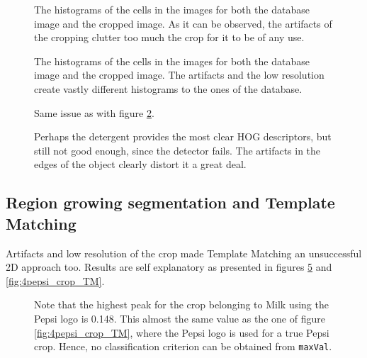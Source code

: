 \documentclass[../main.tex]{subfiles}
\begin{document}
\begin{figure}[htbp]
    \centering
    \caption{The histograms of the cells in the images for both the database image and the cropped image. As it can be observed, the artifacts of the cropping clutter too much the crop for it to be of any use.}
    \label{fig:hog_milk_crop}
\end{figure}

\begin{figure}[htbp]
    \centering
    \caption{The histograms of the cells in the images for both the database image and the cropped image. The artifacts and the low resolution create vastly different histograms to the ones of the database.}
    \label{fig:hog_pepsi_crop}
\end{figure}

\begin{figure}[htbp]
    \centering
    \caption{Same issue as with figure \ref{fig:hog_pepsi_crop}.}
    \label{fig:hog_cocacola_crop}
\end{figure}

\begin{figure}[htbp]
    \centering
    \caption{Perhaps the detergent provides the most clear HOG descriptors, but still not good enough, since the detector fails. The artifacts in the edges of the object clearly distort it a great deal.}
    \label{fig:hog_detergent_crop}
\end{figure}

\subsection{Region growing segmentation and Template Matching}
Artifacts and low resolution of the crop made Template Matching an unsuccessful 2D approach too. Results are self explanatory as presented in figures \ref{fig:0pepsiVSmilk_crop_TM} and \ref{fig:4pepsi_crop_TM}.

\begin{figure}[H]
    \centering
    \caption{Note that the highest peak for the crop belonging to Milk using the Pepsi logo is 0.148. This almost the same value as the one of figure \ref{fig:4pepsi_crop_TM}, where the Pepsi logo is used for a true Pepsi crop. Hence, no classification criterion can be obtained from \texttt{maxVal}.}
    \label{fig:0pepsiVSmilk_crop_TM}
\end{figure}
\end{document}
